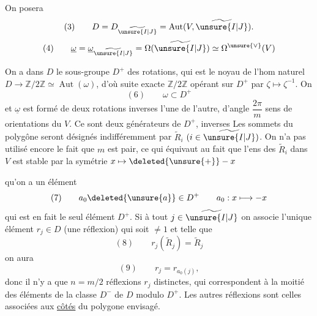 
On posera
\[
(3)\qquad D=D_{\widetilde{\unsure{I|J}}}=\operatorname{Aut}(V,\widetilde{\unsure{I|J}}).
\]
\[
(4)\qquad\underline\omega=\underline\omega_{\widetilde{\unsure{I|J}}}
=\Omega(\widetilde{\unsure{I|J}})\simeq\Omega^{\unsure{\vee}}(V)
\]

On a dans $D$ le sous-groupe $D^+$ des rotations, qui est le noyau
de l'hom naturel 
$D\longrightarrow\mathbb Z/2\mathbb Z\simeq\operatorname{Aut}(\omega)$,
d'où suite exacte
$\mathbb Z/2\mathbb Z$ opérant sur $D^+$ par $\zeta\mapsto\zeta^{-1}$.
On  
\[
(6)\qquad\omega\subset D^+
\]
et $\underline\omega$ est formé de deux rotations inverses l'une de l'autre,
d'angle $\dfrac{2\pi}{m}$   sens de
  orientations du $V$.
Ce sont deux générateurs de $D^+$, inverses
Les  sommets du polygône seront désignés indifféremment par
$\widetilde R_i$ $(i\in\widetilde{\unsure{I|J}})$.
On n'a pas utilisé encore le fait que $m$ est pair, ce qui équivaut au fait que
l'ens des $\widetilde R_i$ dans $V$ est stable par la symétrie
$x\mapsto\deleted{\unsure{+}}-x$

  qu'on a un élément
 
\[
(7)\qquad a_0\deleted{\unsure{a}}\in D^+
\qquad a_0:x\longmapsto-x
\]
qui est en fait le seul élément  $D^+$.
Si à tout $j\in\widetilde{\unsure{I|J}}$ on associe l'unique
 élément $r_j\in D$ (une réflexion)
 qui soit $\ne1$ et telle que
\[
(8)\qquad r_j(\widetilde R_j)=\widetilde R_j
\]
on aura
\[
(9)\qquad r_j=r_{a_0(j)},
\]
 donc il n'y a que $n=m/2$ réflexions $r_j$ distinctes,
qui correspondent à la moitié des éléments de la classe 
$D^-$ de $D$ modulo $D^+$. Les autres réflexions sont celles associées aux
\uline{côtés} du polygone envisagé.

